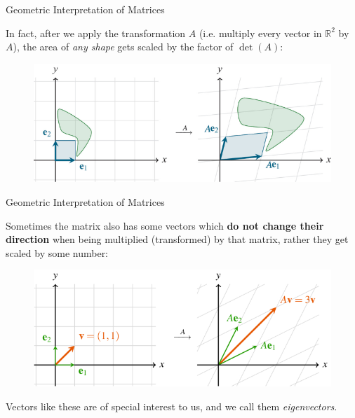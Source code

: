 \documentclass{beamer}
\newcommand{\R}{\mathbb{R}}
\begin{document}
\begin{frame}{Geometric Interpretation of Matrices}

In fact, after we apply the transformation $A$ (i.e. multiply every vector in $\R^2$ by $A$), the area of \textit{any shape} gets scaled by the factor of $\det(A)$:

\begin{figure}
    \centering
    \includegraphics[width=0.75\linewidth]{viz area.png}
    
    
\end{figure}

\end{frame}








\begin{frame}{Geometric Interpretation of Matrices}

Sometimes the matrix also has some vectors which \textbf{do not change their direction} when being multiplied (transformed) by that matrix, rather they get scaled by some number:

\begin{figure}
    \centering
    \includegraphics[width=0.75\linewidth]{viz eig.png}
    
\end{figure}

\pause

Vectors like these are of special interest to us, and we call them \textit{eigenvectors}.
\end{frame}
\end{document}
